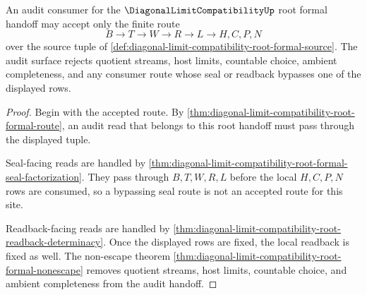 \begin{theorem}
\label{thm:diagonal-limit-compatibility-root-formal-audit-handoff}
An audit consumer for the $\DiagonalLimitCompatibilityUp$ root formal handoff may accept only the finite route
$$
B \longrightarrow T \longrightarrow W \longrightarrow R \longrightarrow L \longrightarrow H,C,P,N
$$
over the source tuple of \autoref{def:diagonal-limit-compatibility-root-formal-source}. The audit surface rejects quotient streams, host limits, countable choice, ambient completeness, and any consumer route whose seal or readback bypasses one of the displayed rows.
\end{theorem}
\begin{proof}
Begin with the accepted route. By \autoref{thm:diagonal-limit-compatibility-root-formal-route}, an audit read that belongs to this root handoff must pass through the displayed tuple.

Seal-facing reads are handled by \autoref{thm:diagonal-limit-compatibility-root-formal-seal-factorization}. They pass through $B,T,W,R,L$ before the local $H,C,P,N$ rows are consumed, so a bypassing seal route is not an accepted route for this site.

Readback-facing reads are handled by \autoref{thm:diagonal-limit-compatibility-root-readback-determinacy}. Once the displayed rows are fixed, the local readback is fixed as well. The non-escape theorem \autoref{thm:diagonal-limit-compatibility-root-formal-nonescape} removes quotient streams, host limits, countable choice, and ambient completeness from the audit handoff.
\end{proof}
